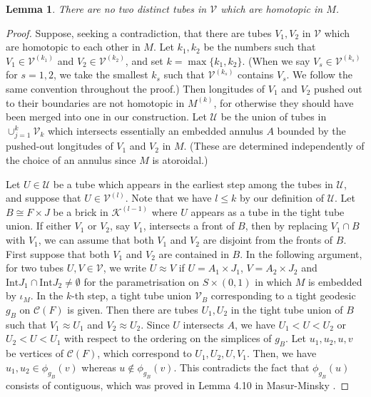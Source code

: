 \documentclass{amsart}
\newtheorem{lemma}[theorem]{Lemma}
\theoremstyle{definition}
\numberwithin{figure}{section}
\numberwithin{equation}{section}
\newcommand{\blackboard}[1]{\ensuremath{\mathbb{#1}}}
\newcommand{\complexes}{\blackboard{C}}
\def\cc{\complexes}
\def\cc{\mathcal{C}}
\def\ck{\mathcal{K}}
\def\cu{\mathcal{U}}
\def\cv{\mathcal{V}}
\def\Int{\mathrm{Int}}
\begin{document}
\begin{lemma}
\label{no homotopic tubes}
There are no two distinct tubes in $\cv$ which are homotopic in $M$.
\end{lemma}
\begin{proof}
Suppose, seeking a contradiction, that there are tubes $V_1, V_2$ in $\cv$ which are homotopic to each other in $M$.
Let $k_1, k_2$ be the numbers such that $V_1 \in \cv^{(k_1)}$ and $V_2 \in \cv^{(k_2)}$, and set $k= \max\{k_1, k_2\}$.
(When we say $V_s \in \cv^{(k_s)}$ for $s=1,2$, we take the smallest $k_s$ such that $\cv^{(k_s)}$ contains $V_s$.
We follow the same convention throughout the proof.)
Then longitudes of $V_1$ and $V_2$ pushed out to their boundaries are not homotopic in $M^{(k)}$, for otherwise they should have been merged into one in our construction.
Let $\cu$ be the union of  tubes in $\cup_{j=1}^k \cv_k$ which intersects essentially an embedded annulus $A$ bounded by the pushed-out longitudes of $V_1$ and $V_2$ in $M$.
(These are determined independently of the choice of an annulus since $M$ is atoroidal.)

Let $U \in \cu$ be a tube which appears in the earliest step among the tubes in $\cu$, and suppose that $U \in \cv^{(l)}$.
Note that we have $l \leq k$ by our definition of $\cu$.
Let $B \cong F \times J$ be a brick in $\ck^{(l-1)}$ where $U$ appears as a tube in the tight tube union.
If either  $V_1$ or $V_2$, say $V_1$,  intersects a front of $B$, then by replacing $V_1 \cap B$ with $V_1$, we can assume that both $V_1$ and $V_2$ are disjoint from the fronts of $B$.
First suppose that both $V_1$ and $V_2$ are contained in $B$.
In the following argument, for two tubes $U,V \in \cv$, we write $U \approx V$ if $U=A_1 \times J_1$, $V=A_2 \times J_2$ and $\Int J_1 \cap \Int J_2 \neq \emptyset$ for the parametrisation on $S \times (0,1)$ in which $M$ is embedded by $\iota_M$.
In the $k$-th step, a tight tube union $\cv_B$ corresponding to a tight geodesic $g_B$ on $\cc(F)$ is given.
Then there are tubes $U_1, U_2$ in the tight tube union of $B$ such that $V_1 \approx U_1$ and $V_2 \approx U_2$.
Since $U$ intersects $A$, we have $U_1 < U < U_2$ or $U_2 < U < U_1$ with respect to the ordering on the simplices of $g_B$.
Let $u_1, u_2, u, v$ be vertices of $\cc(F)$, which correspond to $U_1, U_2, U, V_1$.
Then, we have $u_1, u_2\in \phi_{g_B}(v)$ whereas $u\not\in \phi_{g_B}(v)$.
This contradicts the fact that $\phi_{g_B}(u)$ consists of contiguous, which was proved in Lemma 4.10 in Masur-Minsky \cite{mm2}.


\end{proof}
\end{document}
